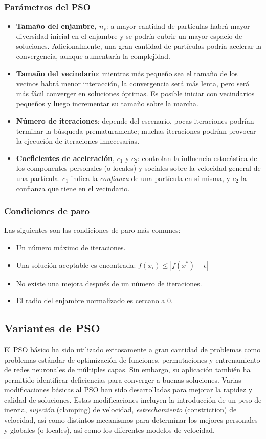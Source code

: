 \documentclass{article}
\begin{document}
\subsubsection{Parámetros del PSO}
\begin{itemize}
	\item \textbf{Tamaño del enjambre, $n_s$}: a mayor cantidad de partículas habrá mayor diversidad inicial en el enjambre y se podría cubrir un mayor espacio de soluciones.
	Adicionalmente, una gran cantidad de partículas podría acelerar la convergencia, aunque aumentaría la complejidad.
	\item \textbf{Tamaño del vecindario}: mientras más pequeño sea el tamaño de los vecinos habrá menor interacción, la convergencia será más lenta, pero será más fácil converger en soluciones óptimas.
	Es posible iniciar con vecindarios pequeños y luego incrementar su tamaño sobre la marcha.
	\item \textbf{Número de iteraciones}: depende del escenario, pocas iteraciones podrían terminar la búsqueda prematuramente; muchas iteraciones podrían provocar la ejecución de iteraciones innecesarias.
	\item \textbf{Coeficientes de aceleración}, $c_1$ y $c_2$: controlan la influencia estocástica de los componentes personales (o locales) y sociales sobre la velocidad general de una partícula. $c_1$ indica la \emph{confianza} de una partícula en sí misma, y $c_2$ la confianza que tiene en el vecindario.
\end{itemize}

\subsubsection{Condiciones de paro} 
Las siguientes son las condiciones de paro más comunes:
\begin{itemize}
	\item Un número máximo de iteraciones.
	\item Una solución aceptable es encontrada: $f(x_i) \leq |f(x^*) - \epsilon |$
	\item No existe una mejora después de un número de iteraciones.
	\item El radio del enjambre normalizado es cercano a 0.
\end{itemize}

\subsection{Variantes de PSO}
El PSO básico ha sido utilizado exitosamente a gran cantidad de problemas como problemas estándar de optimización de funciones, permutaciones y entrenamiento de redes neuronales de múltiples capas.
Sin embargo, su aplicación también ha permitido identificar deficiencias para converger a buenas soluciones.
Varias modificaciones básicas al PSO han sido desarrolladas para mejorar la rapidez y calidad de soluciones.
Estas modificaciones incluyen la introducción de un peso de inercia, \emph{sujeción} (clamping) de velocidad, \emph{estrechamiento} (constriction) de velocidad, así como distintos mecanismos para determinar los mejores personales y globales (o locales), así como los diferentes modelos de velocidad.
\end{document}
